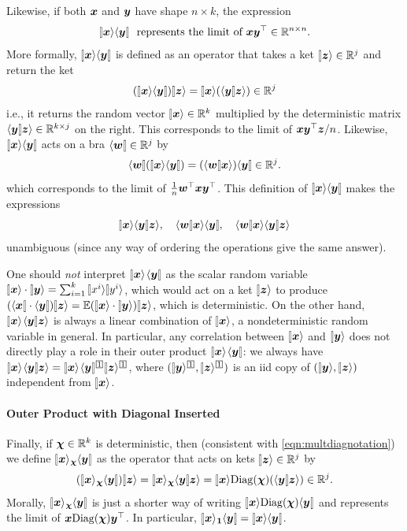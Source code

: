 \documentclass{article}
\theoremstyle{plain}
\theoremstyle{definition}
\begin{document}
Likewise, if both $\boldsymbol{x}$ and $\boldsymbol{y}$ have shape $n\times k$, the expression
\[
\ket{\xx}\bra{\yy}\ \text{ represents the limit of $\xx\yy^{\trsp}\in\R^{n\times n}$.}
\]
More formally,
$\ket{\xx}\bra{\yy}$ is defined as an operator that takes a ket $\ket{\zz}\in\R^{j}$
and return the ket
\[
(\ket{\xx}\bra{\yy})\ket{\zz}=\ket{\xx}(\braket{\yy}{\zz})\in\R^{j}
\]
i.e., it returns the random vector $\ket{\xx}\in\R^{k}$ multiplied
by the deterministic matrix $\braket{\yy}{\zz}\in\R^{k\times j}$
on the right. 
This corresponds to the limit of $\boldsymbol{x} \boldsymbol{y}^\top \boldsymbol{z}/n$.
Likewise, $\ket{\xx}\bra{\yy}$ acts on a bra $\bra{\ww}\in\R^{j}$
by
\[
\bra{\ww}(\ket{\xx}\bra{\yy})=(\braket{\ww}{\xx})\bra{\yy}\in\R^{j}.
\]
which corresponds to the limit of $\frac 1 n \boldsymbol{w}^\top \boldsymbol{x} \boldsymbol{y}^\top$.
This definition of $\ket{\xx}\bra{\yy}$ makes the expressions
\[
\ket{\xx}\braket{\yy}{\zz},\quad\braket{\ww}{\xx}\bra{\yy},\quad\braket{\ww}{\xx}\braket{\yy}{\zz}
\]
unambiguous (since any way of ordering the operations give the same
answer).

\begin{rem}
One should \emph{not} interpret $\ketdbra{\xx}{}\yy$ as the scalar random variable $\ket\xx \cdot \ket \yy  = \sum_{i=1}^k \ket {x^i}\ket{y^i}$, which would act on a ket $\ket{\zz}$ to produce $(\bra{\xx} \cdot \bra\yy)\ket{\zz} = \EV (\ket\xx \cdot \ket \yy)\ket{\zz} $, which is deterministic.
On the other hand, $\ketdbra{\xx}{}\yy \zz \ra$ is always a linear combination of $\ket \xx$, a nondeterministic random variable in general.
In particular, any correlation between $\ket \xx$ and $\ket \yy$ does not directly play a role in their outer product $\ketdbra\xx{}\yy$: we always have $\ketdbra{\xx}{}\yy \zz \ra = \ketdbra{\xx}{}\yy^{\bx1} \ket\zz^{\bx1}$, where $(\ket \yy^{\bx1}, \ket \zz^{\bx1})$ is an iid copy of $(\ket \yy, \ket \zz)$ independent from $\ket \xx$.
\end{rem}

\paragraph{Outer Product with Diagonal Inserted}
Finally, if $\boldsymbol{\chi}\in\mathbb{R}^{k}$ is deterministic, then (consistent with \cref{eqn:multdiagnotation}) we define $\ketdbra{\xx}{\cchi}{\yy}$
as the operator that acts on kets $\ket{\zz}\in\R^{j}$ by
\[
(\ketdbra{\xx}{\cchi}{\yy})\ket{\zz}=\ketdbra{\xx}{\cchi}{\yy}{\zz}\ra=\ket{\xx}\Diag(\cchi)(\braket{\yy}{\zz})\in\R^{j}.
\]
Morally, $\ketdbra{\xx}{\cchi}{\yy}$ is just a shorter way of writing
$\ket{\xx}\Diag(\cchi)\bra{\yy}$ and represents the limit of $\boldsymbol{x}\mathrm{Diag}(\boldsymbol{\chi})\boldsymbol{y}^{\top}$.
In particular, $\ketdbra{\xx}{\boldsymbol{1}}{\yy}=\ket{\xx}\bra{\yy}$.
\end{document}
